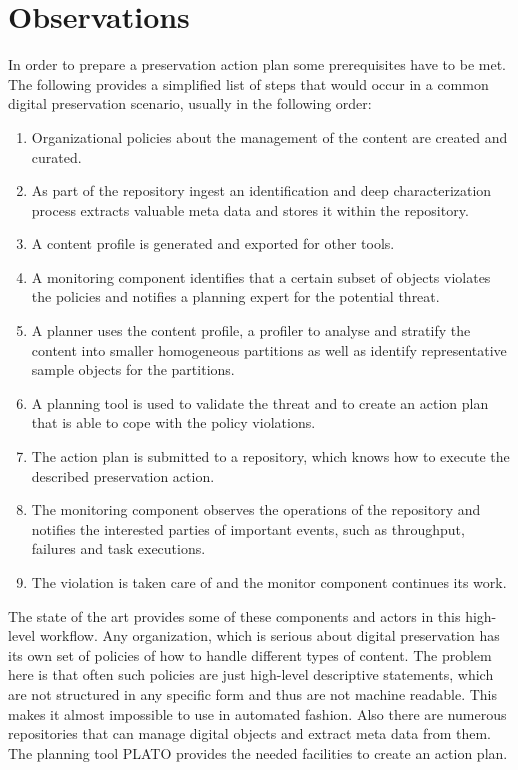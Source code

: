 \section{Observations}
In order to prepare a preservation action plan some prerequisites have to be met. The following provides a simplified list of steps that would occur in a common digital preservation scenario, usually in the following order: 
\begin{enumerate}
\item Organizational policies about the management of the content are created and curated.
\item As part of the repository ingest an identification and deep characterization process extracts valuable meta data and stores it within the repository.
\item A content profile is generated and exported for other tools.
\item A monitoring component identifies that a certain subset of objects violates the policies and notifies a planning expert for the potential threat.
\item A planner uses the content profile, a profiler to analyse and stratify the content into smaller homogeneous partitions as well as identify representative sample objects for the partitions.
\item A planning tool is used to validate the threat and to create an action plan that is able to cope with the policy violations.
\item The action plan is submitted to a repository, which knows how to execute the described preservation action.
\item The monitoring component observes the operations of the repository and notifies the interested parties of important events, such as throughput, failures and task executions. 
\item The violation is taken care of and the monitor component continues its work.
\end{enumerate}

The state of the art provides some of these components and actors in this high-level workflow. Any organization, which is serious about digital preservation has its own set of policies of how to handle different types of content. The problem here is that often such policies are just high-level descriptive statements, which are not structured in any specific form and thus are not machine readable. This makes it almost impossible to use in automated fashion. Also there are numerous repositories that can manage digital objects and extract meta data from them. The planning tool PLATO provides the needed facilities to create an action plan.

